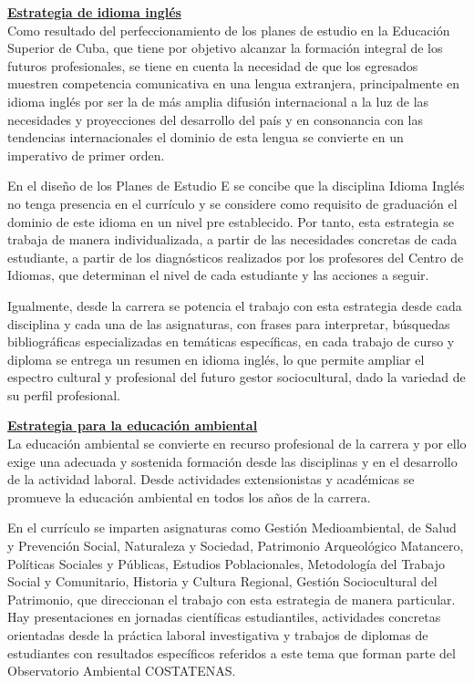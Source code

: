 \underline{\textbf{Estrategia de idioma inglés}}\\
Como resultado del perfeccionamiento de los planes de estudio en la Educación Superior de Cuba, que tiene por objetivo alcanzar la formación integral de los futuros profesionales, se tiene en cuenta la necesidad de que los egresados muestren competencia comunicativa en una lengua extranjera, principalmente en idioma inglés por ser la de más amplia difusión internacional a la luz de las necesidades y proyecciones del desarrollo del país y en consonancia con las tendencias internacionales el dominio de esta lengua se convierte en un imperativo de primer orden. 

En el diseño de los Planes de Estudio E se concibe que la disciplina Idioma Inglés no tenga presencia en el currículo y se considere como requisito de graduación el dominio de este idioma en un nivel pre establecido. Por tanto, esta estrategia se trabaja de manera individualizada, a partir de las necesidades concretas de cada estudiante, a partir de los diagnósticos realizados por los profesores del Centro de Idiomas, que determinan el nivel de cada estudiante y las acciones a seguir.
 
Igualmente, desde la carrera se potencia el trabajo con esta estrategia desde cada disciplina y cada una de las asignaturas, con frases para interpretar, búsquedas bibliográficas especializadas en temáticas específicas, en cada trabajo de curso y diploma se entrega un resumen en idioma inglés, lo que permite ampliar el espectro cultural y profesional del futuro gestor sociocultural, dado la variedad de su perfil profesional.

\underline{\textbf{Estrategia para la educación ambiental}}\\
La educación ambiental se convierte en recurso profesional de la carrera y por ello exige una adecuada y sostenida formación desde las disciplinas y en el desarrollo de la actividad laboral. Desde actividades extensionistas y académicas se promueve la educación ambiental en todos los años de la carrera.

En el currículo se imparten asignaturas como Gestión Medioambiental, de Salud y Prevención Social, Naturaleza y Sociedad, Patrimonio Arqueológico Matancero, Políticas Sociales y Públicas, Estudios Poblacionales, Metodología del Trabajo Social y Comunitario, Historia y Cultura Regional, Gestión Sociocultural del Patrimonio, que direccionan el trabajo con esta estrategia de manera particular. Hay presentaciones en jornadas científicas estudiantiles, actividades concretas orientadas desde la práctica laboral investigativa y trabajos de diplomas de estudiantes con resultados específicos referidos a este tema que forman parte del Observatorio Ambiental COSTATENAS.

